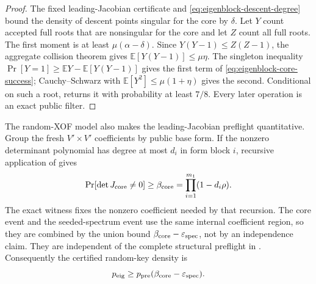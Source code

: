 \documentclass[11pt]{article}
\begin{document}
\begin{proof}
The fixed leading-Jacobian certificate and
\eqref{eq:eigenblock-descent-degree} bound the density of descent points
singular for the core by $\delta$.  Let $Y$ count accepted full roots that are
nonsingular for the core and let $Z$ count all full roots.  The first moment is
at least $\mu(\alpha-\delta)$.  Since $Y(Y-1)\le Z(Z-1)$, the aggregate
collision theorem gives $\mathbb E[Y(Y-1)]\le\mu\eta$.  The singleton
inequality $\Pr[Y=1]\ge\mathbb EY-\mathbb E[Y(Y-1)]$ gives the first term of
\eqref{eq:eigenblock-core-success}; Cauchy--Schwarz with
$\mathbb E[Y^2]\le\mu(1+\eta)$ gives the second.  Conditional on such a root,
 returns it with probability at least
$7/8$.  Every later operation is an exact public filter.
\end{proof}

The random-XOF model also makes the leading-Jacobian preflight quantitative.
Group the fresh $V'\times V'$ coefficients by public base form.  If the
nonzero determinant polynomial has degree at most $d_i$ in form block $i$,
recursive application of  gives
\begin{equation}\label{eq:block-anticoncentration}
 \Pr[\det J_{\rm core}\ne0]\ge
 \beta_{\rm core}=\prod_{i=1}^{m_1}(1-d_i\rho).
\end{equation}
The exact witness fixes the nonzero coefficient needed by that recursion.  The
core event and the seeded-spectrum event use the same internal coefficient
region, so they are combined by the union bound
$\beta_{\rm core}-\varepsilon_{\rm spec}$, not by an independence claim.
They are independent of the complete structural preflight in
.  Consequently the certified
random-key density is
\begin{equation}\label{eq:eigenblock-vulnerable-density}
 p_{\rm eig}
 \ge p_{\rm pre}(\beta_{\rm core}-\varepsilon_{\rm spec}).
\end{equation}
\end{document}
